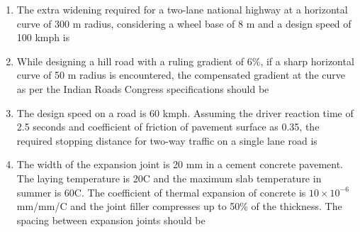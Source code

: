 \documentclass[journal,12pt,onecolumn]{IEEEtran}
\theoremstyle{remark}
\begin{document}
\begin{enumerate}
\begin{enumerate}
\end{enumerate}
\item The extra widening required for a two-lane national highway at a horizontal curve of 300 m radius, considering a wheel base of 8 m and a design speed of 100 kmph is
\begin{enumerate}
\end{enumerate}
\item While designing a hill road with a ruling gradient of 6\%, if a sharp horizontal curve of 50 m radius is encountered, the compensated gradient at the curve as per the Indian Roads Congress specifications should be
\begin{enumerate}
\end{enumerate}
\item The design speed on a road is 60 kmph. Assuming the driver reaction time of 2.5 seconds and coefficient of friction of pavement surface as 0.35, the required stopping distance for two-way traffic on a single lane road is
\begin{enumerate}
\end{enumerate}
\item The width of the expansion joint is 20 mm in a cement concrete pavement. The laying temperature is 20\degree C and the maximum slab temperature in summer is 60\degree C. The coefficient of thermal expansion of concrete is $10\times10^{-6}$ mm/mm/\degree C and the joint filler compresses up to 50\% of the thickness. The spacing between expansion joints should be 

\end{enumerate}
\end{document}
